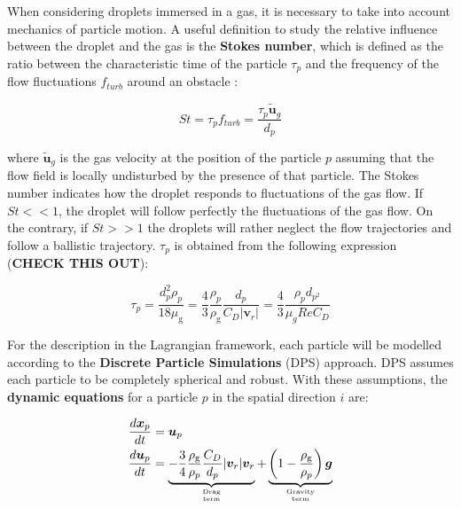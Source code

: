When considering droplets immersed in a gas, it is necessary to take into account mechanics of particle motion. A useful definition to study the relative influence between the droplet and the gas is the \textbf{Stokes number}, which is defined as the ratio between the characteristic time of the particle $\tau_p$ and the frequency of the flow fluctuations $f_{turb}$ around an obstacle :

\begin{equation}
St = \tau_p f_{turb} = \frac{\tau_p \widetilde{\boldsymbol{u}}_g}{d_p}
\end{equation}

where $\widetilde{\boldsymbol{u}}_g$ is the gas velocity at the position of the particle $p$ assuming that the flow field is locally undisturbed by the presence of that particle. The Stokes number indicates how the droplet responds to fluctuations of the gas flow. If $St << 1$, the droplet will follow perfectly the fluctuations of the gas flow. On the contrary, if $St >> 1$ the droplets will rather neglect the flow trajectories and follow a ballistic trajectory. $\tau_p$ is obtained from the following expression (\textbf{CHECK THIS OUT}):


\begin{equation}
\tau_p = \frac{d_p^2 \rho_p}{18 \mu_\mathrm{g}} =  \frac{4}{3} \frac{\rho_p}{\rho_\mathrm{g}} \frac{d_p}{C_D | \boldsymbol{v}_r |} = \frac{4}{3} \frac{\rho_p d_{p^2}}{\mu_g Re C_D}
\end{equation}

For the description in the Lagrangian framework, each particle will be modelled according to the \textbf{Discrete Particle Simulations} (DPS) approach. DPS assumes each particle to be completely spherical and robust. With these assumptions, the \textbf{dynamic equations} for a particle $p$ in the spatial direction $i$ are:

\begin{subequations}
\label{eq:TPF_lagrange_dynamic_eqs}
\begin{align}
\frac{d \boldsymbol{x}_p}{d t} &= \boldsymbol{u}_p \\
\frac{d \boldsymbol{u}_p}{d t} &= \underbrace{ - \frac{3}{4} \frac{\rho_\mathrm{g}}{\rho_p} \frac{C_D}{d_p} | \boldsymbol{v}_r | \boldsymbol{v}_r }_{\text{Drag}\atop\text{term}}  + \underbrace{ \left( 1 - \frac{\rho_\mathrm{g}}{\rho_p} \right) \boldsymbol{g} }_{\text{Gravity}\atop\text{term}} 
\end{align}
\end{subequations}

